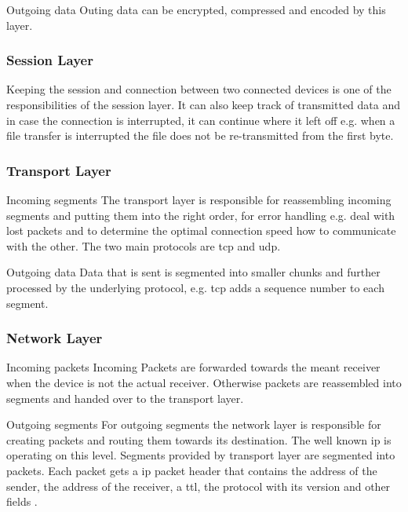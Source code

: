 Outgoing data\newline
Outing data can be encrypted, compressed and encoded by this layer.

\subsubsection{Session Layer}
Keeping the session and connection between two connected devices is one of the responsibilities of the session layer. It can also keep track of transmitted data and in case the connection is interrupted, it can continue where it left off e.g. when a file transfer is interrupted the file does not be re-transmitted from the first byte. 

\subsubsection{Transport Layer}
Incoming segments\newline
The transport layer is responsible for reassembling incoming segments and putting them into the right order, for error handling e.g. deal with lost packets and to determine the optimal connection speed how to communicate with the other. 
The two main protocols are \gls{tcp} and \gls{udp}.

Outgoing data\newline
Data that is sent is segmented into smaller chunks and further processed by the underlying protocol, e.g. \gls{tcp} adds a sequence number to each segment.

\subsubsection{Network Layer}
Incoming packets\newline
Incoming Packets are forwarded towards the meant receiver when the device is not the actual receiver. Otherwise packets are reassembled into segments and handed over to the transport layer.

Outgoing segments\newline
For outgoing segments the network layer is responsible for creating packets and routing them towards its destination.
The well known \gls{ip} is operating on this level. Segments provided by transport layer are segmented into packets. Each packet gets a \gls{ip} packet header that contains the address of the sender, the address of the receiver, a \gls{ttl}, the protocol with its version and other fields \cite{rfc791-ip}.

